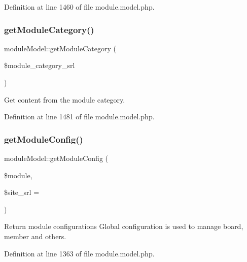 Definition at line 1460 of file module.\+model.\+php.

\hypertarget{classmoduleModel_a75669086647f78470306c840c22f36b1}{}\label{classmoduleModel_a75669086647f78470306c840c22f36b1} 
\subsubsection{\texorpdfstring{get\+Module\+Category()}{getModuleCategory()}}
{\footnotesize\ttfamily module\+Model\+::get\+Module\+Category (\begin{DoxyParamCaption}\item[{}]{\$module\+\_\+category\+\_\+srl }\end{DoxyParamCaption})}



Get content from the module category. 



Definition at line 1481 of file module.\+model.\+php.

\hypertarget{classmoduleModel_ae8005c8ab7ee3b9e6ddd7f71bb2b4698}{}\label{classmoduleModel_ae8005c8ab7ee3b9e6ddd7f71bb2b4698} 
\subsubsection{\texorpdfstring{get\+Module\+Config()}{getModuleConfig()}}
{\footnotesize\ttfamily module\+Model\+::get\+Module\+Config (\begin{DoxyParamCaption}\item[{}]{\$module,  }\item[{}]{\$site\+\_\+srl = {} }\end{DoxyParamCaption})}



Return module configurations Global configuration is used to manage board, member and others. 



Definition at line 1363 of file module.\+model.\+php.

\hypertarget{classmoduleModel_a2b22943c4d212c8284ef9780e0ebf3bd}{}\label{classmoduleModel_a2b22943c4d212c8284ef9780e0ebf3bd} 
